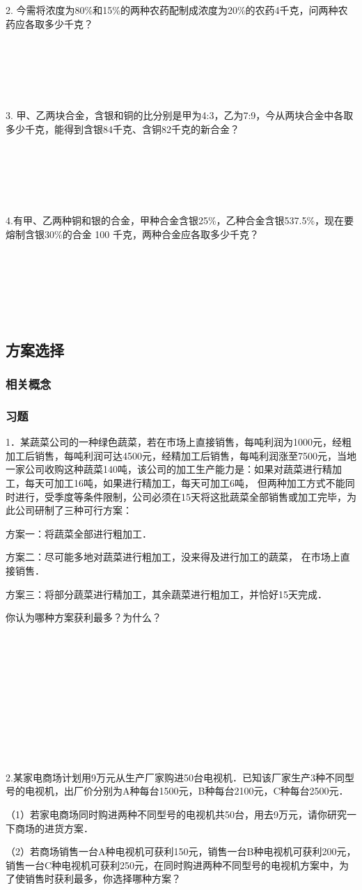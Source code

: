 \documentclass{article}
\begin{document}
~\\
~\\
~\\
~\\
~\\
2. 今需将浓度为80\%和15\%的两种农药配制成浓度为20\%的农药4千克，问两种农药应各取多少千克？

~\\
~\\
~\\
~\\
~\\
3. 甲、乙两块合金，含银和铜的比分别是甲为4:3，乙为7:9，今从两块合金中各取多少千克，能得到含银84千克、含铜82千克的新合金？

~\\
~\\
~\\
~\\
~\\
4.有甲、乙两种铜和银的合金，甲种合金含银25\%，乙种合金含银537.5\%，现在要熔制含银30\%的合金 100 千克，两种合金应各取多少千克？

~\\
~\\
~\\
~\\
~\\
\subsection{方案选择}
\subsubsection*{相关概念}
\subsubsection*{习题}
1．某蔬菜公司的一种绿色蔬菜，若在市场上直接销售，每吨利润为1000元，经粗加工后销售，每吨利润可达4500元，经精加工后销售，每吨利润涨至7500元，当地一家公司收购这种蔬菜140吨，该公司的加工生产能力是：如果对蔬菜进行精加工，每天可加工16吨，如果进行精加工，每天可加工6吨， 但两种加工方式不能同时进行，受季度等条件限制，公司必须在15天将这批蔬菜全部销售或加工完毕，为此公司研制了三种可行方案：

方案一：将蔬菜全部进行粗加工．

方案二：尽可能多地对蔬菜进行粗加工，没来得及进行加工的蔬菜， 在市场上直接销售．

方案三：将部分蔬菜进行精加工，其余蔬菜进行粗加工，并恰好15天完成．

你认为哪种方案获利最多？为什么？

~\\
~\\
~\\
~\\
~\\
~\\
~\\
~\\
~\\
~\\
2.某家电商场计划用9万元从生产厂家购进50台电视机．已知该厂家生产3种不同型号的电视机，出厂价分别为A种每台1500元，B种每台2100元，C种每台2500元．

（1）若家电商场同时购进两种不同型号的电视机共50台，用去9万元，请你研究一下商场的进货方案．

（2）若商场销售一台A种电视机可获利150元，销售一台B种电视机可获利200元， 销售一台C种电视机可获利250元，在同时购进两种不同型号的电视机方案中，为了使销售时获利最多，你选择哪种方案？
\end{document}
